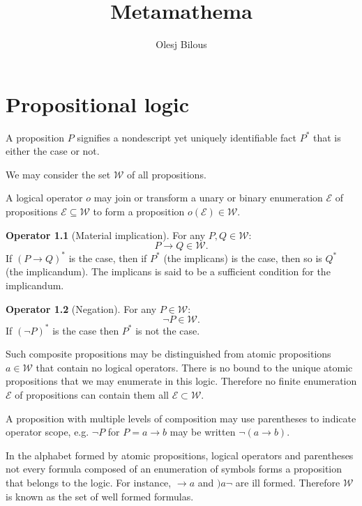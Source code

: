\documentclass{amsbook}
\newcommand{\then}{\mathrel\rightarrow}
\newcommand{\wffs}{\mathcal W}
\theoremstyle{definition}
\newtheorem{op}{Operator}[section]
\begin{document}
\title{Metamathema}
\author{Olesj Bilous}
\maketitle

\chapter{Propositional logic}

A proposition $P$ signifies a nondescript yet uniquely identifiable fact $P^*$ that is either the case or not.

We may consider the set $\mathcal W$ of all propositions.

A logical operator $o$ may join or transform a unary or binary enumeration $\mathcal E$ of propositions $\mathcal E \subseteq \mathcal W$ to form a proposition $o(\mathcal E) \in \mathcal W$.

\begin{op}[Material implication]
    For any $P, Q \in \wffs$:
    $$
        P \rightarrow Q \in \wffs.
    $$
    If $(P \rightarrow Q)^*$ is the case, then if $P^*$ (the implicans) is the case, then so is $Q^*$ (the implicandum). The implicans is said to be a sufficient condition for the implicandum.
\end{op}

\begin{op}[Negation]
    For any $P \in \wffs$:
    $$
        \neg P \in \wffs.
    $$
    If $(\neg P)^*$ is the case then $P^*$ is not the case.
\end{op}

Such composite propositions may be distinguished from atomic propositions $a \in \mathcal W$ that contain no logical operators. There is no bound to the unique atomic propositions that we may enumerate in this logic. Therefore no finite enumeration $\mathcal E$ of propositions can contain them all $\mathcal E \subset \mathcal W$.

A proposition with multiple levels of composition may use parentheses to indicate operator scope, e.g. $\neg P$ for $P = a \then b$ may be written $\neg(a \then b)$.

In the alphabet formed by atomic propositions, logical operators and parentheses not every formula composed of an enumeration of symbols forms a proposition that belongs to the logic. For instance, $\then a$ and $)a \neg$ are ill formed. Therefore $\mathcal W$ is known as the set of well formed formulas.
\end{document}
